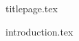 \documentclass[12pt]{article}
\begin{document}
{titlepage.tex}

\tableofcontents

\newpage

{introduction.tex}
\end{document}
